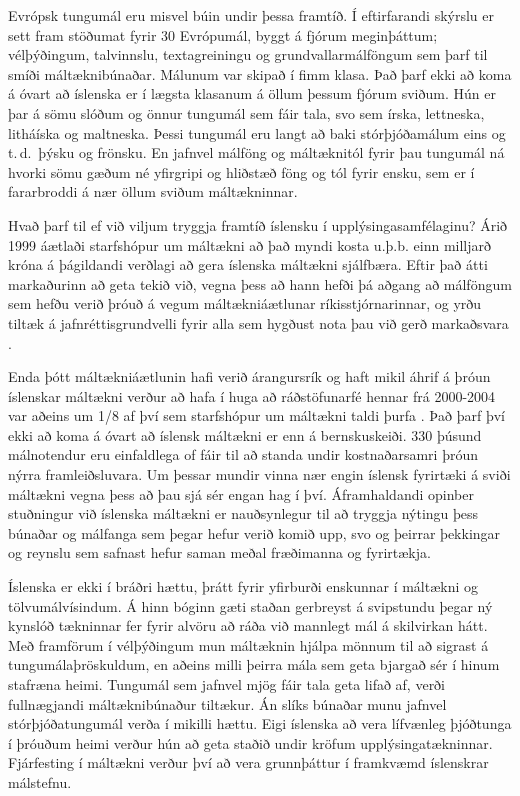 \begin{multicols}{2}
Evrópsk tungumál eru misvel búin undir þessa framtíð. Í eftirfarandi skýrslu er sett fram stöðumat fyrir 30 Evrópumál, byggt á fjórum meginþáttum; vélþýðingum, talvinnslu, textagreiningu og grundvallarmálföngum sem þarf til smíði máltæknibúnaðar. Málunum var skipað í fimm klasa. Það þarf ekki að koma á óvart að íslenska er í lægsta klasanum á öllum þessum fjórum sviðum. Hún er þar á sömu slóðum og önnur tungumál sem fáir tala, svo sem írska, lettneska, litháíska og maltneska. Þessi tungumál eru langt að baki stórþjóðamálum eins og t.\,d.~þýsku og frönsku. En jafnvel málföng og máltæknitól fyrir þau tungumál ná hvorki sömu gæðum né yfirgripi og hliðstæð föng og tól fyrir ensku, sem er í fararbroddi á nær öllum sviðum máltækninnar. 

Hvað þarf til ef við viljum tryggja framtíð íslensku í upplýsingasamfélaginu? Árið 1999 áætlaði starfshópur um máltækni að það myndi kosta u.þ.b. einn milljarð króna á þágildandi verðlagi að gera íslenska máltækni sjálfbæra. Eftir það átti markaðurinn að geta tekið við, vegna þess að hann hefði þá aðgang að málföngum sem hefðu verið þróuð á vegum máltækniáætlunar ríkisstjórnarinnar, og yrðu tiltæk á jafnréttisgrundvelli fyrir alla sem hygðust nota þau við gerð markaðsvara \cite{sky1}.

Enda þótt máltækniáætlunin hafi verið árangursrík og haft mikil áhrif á þróun íslenskar máltækni verður að hafa í huga að ráðstöfunarfé hennar frá 2000-2004 var aðeins um 1/8 af því sem starfshópur um máltækni taldi þurfa \cite{ilrt1}.  Það þarf því ekki að koma á óvart að íslensk máltækni er enn á bernskuskeiði. 330 þúsund málnotendur eru einfaldlega of fáir til að standa undir kostnaðarsamri þróun nýrra framleiðsluvara. Um þessar mundir vinna nær engin íslensk fyrirtæki á sviði máltækni vegna þess að þau sjá sér engan hag í því. Áframhaldandi opinber stuðningur við íslenska máltækni er nauðsynlegur til að tryggja nýtingu þess búnaðar og málfanga sem þegar hefur verið komið upp, svo og þeirrar þekkingar og reynslu sem safnast hefur saman meðal fræðimanna og fyrirtækja.

Íslenska er ekki í bráðri hættu, þrátt fyrir yfirburði enskunnar í máltækni og tölvumálvísindum. Á hinn bóginn gæti staðan gerbreyst á svipstundu þegar ný kynslóð tækninnar fer fyrir alvöru að ráða við mannlegt mál á skilvirkan hátt. Með framförum í vélþýðingum mun máltæknin hjálpa mönnum til að sigrast á tungumálaþröskuldum, en aðeins milli þeirra mála sem geta bjargað sér í hinum stafræna heimi. Tungumál sem jafnvel mjög fáir tala geta lifað af, verði fullnægjandi máltæknibúnaður tiltækur. Án slíks búnaðar munu jafnvel stórþjóðatungumál verða í mikilli hættu. Eigi íslenska að vera lífvænleg þjóðtunga í þróuðum heimi verður hún að geta staðið undir kröfum upplýsingatækninnar. Fjárfesting í máltækni verður því að vera grunnþáttur í framkvæmd íslenskrar málstefnu. 


\end{multicols}
